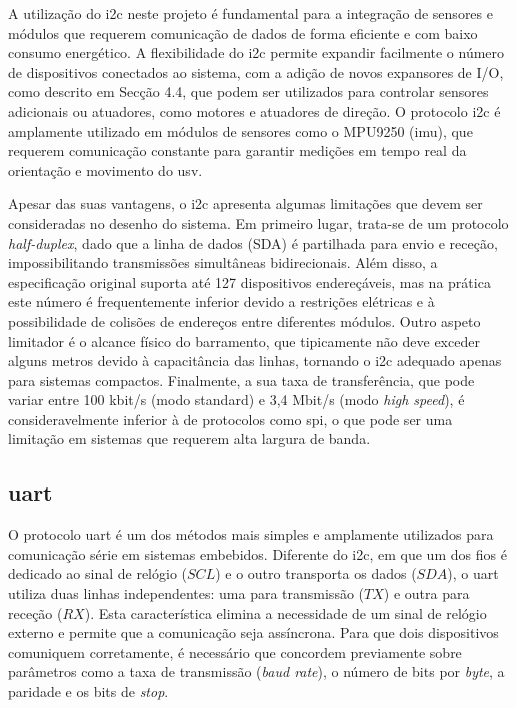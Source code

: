 A utilização do \gls{i2c} neste projeto é fundamental para a integração de sensores e módulos que requerem comunicação de dados de forma eficiente e com baixo consumo energético. A flexibilidade do \gls{i2c} permite expandir facilmente o número de dispositivos conectados ao sistema, com a adição de novos expansores de I/O, como descrito em \cite{didactic-robot-thesis} Secção 4.4, que podem ser utilizados para controlar sensores adicionais ou atuadores, como motores e atuadores de direção. O protocolo \gls{i2c} é amplamente utilizado em módulos de sensores como o MPU9250 (\gls{imu}), que requerem comunicação constante para garantir medições em tempo real da orientação e movimento do \gls{usv}.

Apesar das suas vantagens, o \gls{i2c} apresenta algumas limitações que devem ser consideradas no desenho do sistema. Em primeiro lugar, trata-se de um protocolo \textit{half-duplex}, dado que a linha de dados (SDA) é partilhada para envio e receção, impossibilitando transmissões simultâneas bidirecionais. Além disso, a especificação original suporta até 127 dispositivos endereçáveis, mas na prática este número é frequentemente inferior devido a restrições elétricas e à possibilidade de colisões de endereços entre diferentes módulos. Outro aspeto limitador é o alcance físico do barramento, que tipicamente não deve exceder alguns metros devido à capacitância das linhas, tornando o \gls{i2c} adequado apenas para sistemas compactos. Finalmente, a sua taxa de transferência, que pode variar entre 100 kbit/s (modo standard) e 3,4 Mbit/s (modo \emph{high speed}), é consideravelmente inferior à de protocolos como \gls{spi}, o que pode ser uma limitação em sistemas que requerem alta largura de banda.

\subsection{\acrfull{uart}} 
\label{subsec:uart}

O protocolo \gls{uart} é um dos métodos mais simples e amplamente utilizados para comunicação série em sistemas embebidos. Diferente do \gls{i2c}, em que um dos fios é dedicado ao sinal de relógio (\(SCL\)) e o outro transporta os dados (\(SDA\)), o \gls{uart} utiliza duas linhas independentes: uma para transmissão (\(TX\)) e outra para receção (\(RX\)). Esta característica elimina a necessidade de um sinal de relógio externo e permite que a comunicação seja assíncrona. Para que dois dispositivos comuniquem corretamente, é necessário que concordem previamente sobre parâmetros como a taxa de transmissão (\emph{baud rate}), o número de bits por \emph{byte}, a paridade e os bits de \emph{stop}.

